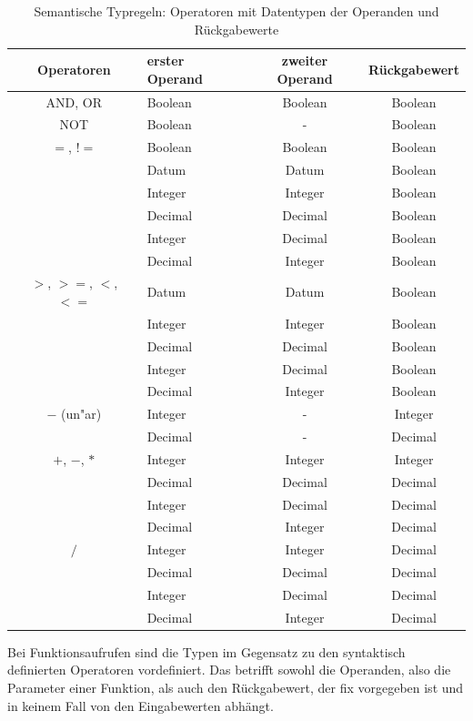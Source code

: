 \begin{table}
\begin{tabular}[ht]{|c l c c|}
  	\hline
  	Operatoren  & erster Operand & zweiter Operand & Rückgabewert\\
  	\hline\hline
  	AND, OR  & Boolean & Boolean & Boolean \\
  	\hline
  	NOT      & Boolean & -       & Boolean \\
  	\hline
  	$ = $, $ != $   & Boolean & Boolean & Boolean \\
  	  	     & Datum   & Datum   & Boolean \\
  	  	     & Integer & Integer & Boolean \\
  	  	     & Decimal & Decimal & Boolean \\
  	  	     & Integer & Decimal & Boolean \\
  	  	     & Decimal & Integer & Boolean \\
	\hline
  	$ > $, $ >= $, $ < $, $ <= $ & Datum   & Datum   & Boolean \\
  	  	     & Integer & Integer & Boolean \\
  	  	     & Decimal & Decimal & Boolean \\
  	  	     & Integer & Decimal & Boolean \\
  	  	     & Decimal & Integer & Boolean \\
	\hline
	$ - $ (un"ar)   & Integer & - & Integer \\
  	  	     & Decimal & - & Decimal \\
	\hline
	$ + $, $ - $, $ * $   & Integer & Integer & Integer \\
  	  	     & Decimal & Decimal & Decimal \\
  	  	     & Integer & Decimal & Decimal \\
  	  	     & Decimal & Integer & Decimal \\
  	\hline
  	$ / $   & Integer & Integer & Decimal \\
  	  	     & Decimal & Decimal & Decimal \\
  	  	     & Integer & Decimal & Decimal \\
  	  	     & Decimal & Integer & Decimal \\
  	\hline
\end{tabular}
\caption{Semantische Typregeln: Operatoren mit Datentypen der Operanden und Rückgabewerte}
\label{tbl_semantische_typregeln}
\end{table}

Bei Funktionsaufrufen sind die Typen im Gegensatz zu den syntaktisch definierten Operatoren vordefiniert. Das betrifft sowohl die Operanden, also die Parameter einer Funktion, als auch den Rückgabewert, der fix vorgegeben ist und in keinem Fall von den Eingabewerten abhängt.



